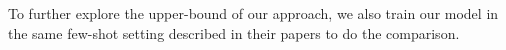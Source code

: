 \documentclass[runningheads]{llncs}
\begin{document}
To further explore the upper-bound of our approach, we also train our model in the same few-shot setting described in their papers to do the comparison.


\end{document}

